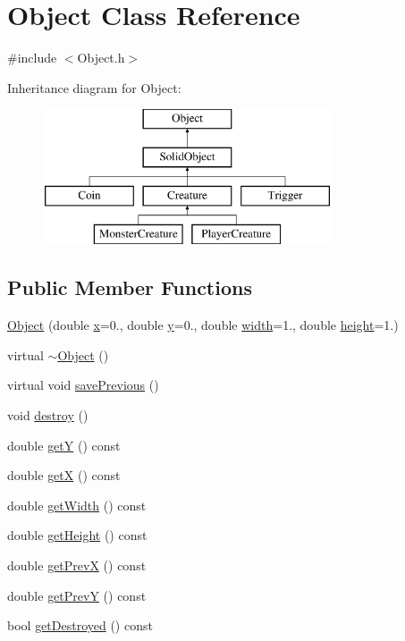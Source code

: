 \hypertarget{class_object}{}\section{Object Class Reference}
\label{class_object}


{\ttfamily \#include $<$Object.\+h$>$}

Inheritance diagram for Object\+:\begin{figure}[H]
\begin{center}
\leavevmode
\includegraphics[height=4.000000cm]{class_object}
\end{center}
\end{figure}
\subsection*{Public Member Functions}
\begin{DoxyCompactItemize}
\item 
\hyperlink{class_object_abf2f1d3f0bcbe2d3fbbeb8952c4e3c9a}{Object} (double \hyperlink{class_object_a02010c1708632be33a760486b1f648f8}{x}=0., double \hyperlink{class_object_a542c4d6094ace575fb4a28f46b9cc6a1}{y}=0., double \hyperlink{class_object_a3afad0ab476968e517b6f48c2a32719f}{width}=1., double \hyperlink{class_object_a811bf2cbf614c4f0a3935a83fb639ffd}{height}=1.)
\item 
virtual \hyperlink{class_object_ae8f5483f459e46687bd01e6f9977afd3}{$\sim$\+Object} ()
\item 
virtual void \hyperlink{class_object_a32051814ea5da4026c5f9517ddb6f212}{save\+Previous} ()
\item 
void \hyperlink{class_object_ad14022400495b1f902037890e7a1cba8}{destroy} ()
\item 
double \hyperlink{class_object_a5c85757552e0dc8a69baf769540cc612}{getY} () const 
\item 
double \hyperlink{class_object_a313c75c1fdb4a1521ed91b27fd648f44}{getX} () const 
\item 
double \hyperlink{class_object_a5156f1f3a18b1a0f0102cab4d63ce591}{get\+Width} () const 
\item 
double \hyperlink{class_object_a0c42d68e0307a118e559d1451430f848}{get\+Height} () const 
\item 
double \hyperlink{class_object_ad3eae730cde5a541376bf80c3bc9e7e6}{get\+PrevX} () const 
\item 
double \hyperlink{class_object_a45112d0d370614c107503c8273a94f00}{get\+PrevY} () const 
\item 
bool \hyperlink{class_object_a6ee13f1d0f43428b60052a7bd0cddfb2}{get\+Destroyed} () const 
\end{DoxyCompactItemize}
